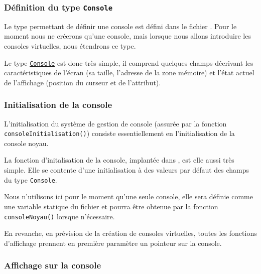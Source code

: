 \subsubsection{Définition du type {\tt Console}}

   Le type permettant de définir une console est défini dans le fichier
. Pour le moment nous ne créerons
qu'une console, mais lorsque nous allons introduire les consoles
virtuelles, nous étendrons ce type.

   Le type \href{html/console_8h_source.html#l00062}{\tt Console} est
donc très simple, il comprend quelques champs décrivant les
caractéristiques de l'écran (sa taille, l'adresse de la zone mémoire)
et l'état actuel de l'affichage (position du curseur et de
l'attribut).
   
%
\subsubsection{Initialisation de la console}

   L'initialisation du système de gestion de console (assurée par la
fonction \lstinline!consoleInitialisation()!) consiste essentiellement
en l'initialisation de la console noyau.

   La fonction d'initalisation de la console, implantée dans
, est elle aussi très simple. Elle se
contente d'une initialisation à des valeurs par défaut des champs du
type {\tt Console}.

   Nous n'utilisons ici pour le moment qu'une seule console, elle sera
définie comme une variable statique du fichier
 et pourra être obtenue par la fonction {\tt
  consoleNoyau()} lorsque n'écessaire.

   En revanche, en prévision de la création de consoles virtuelles,
toutes les fonctions d'affichage prennent en première paramètre un
pointeur sur la console.

%
\subsubsection{Affichage sur la console}

